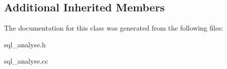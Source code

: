 \subsection*{Additional Inherited Members}


The documentation for this class was generated from the following files\+:\begin{DoxyCompactItemize}
\item 
sql\+\_\+analyse.\+h\item 
sql\+\_\+analyse.\+cc\end{DoxyCompactItemize}
